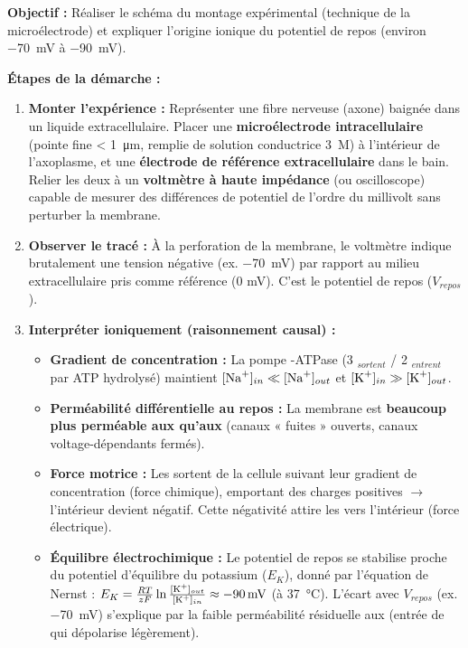 \documentclass[11pt]{article}
\newcommand{\cle}[1]{{\popxbold\color{popdark}#1}}
\begin{document}
\begin{methode}
\textbf{Objectif :} Réaliser le schéma du montage expérimental (technique de la microélectrode) et expliquer l'origine ionique du potentiel de repos (environ \SI{-70}{mV} à \SI{-90}{mV}).

\textbf{Étapes de la démarche :}
\begin{enumerate}
    \item \textbf{Monter l'expérience :} Représenter une fibre nerveuse (axone) baignée dans un liquide extracellulaire. Placer une \textbf{microélectrode intracellulaire} (pointe fine < \SI{1}{\micro\meter}, remplie de solution conductrice  \SI{3}{M}) à l'intérieur de l'axoplasme, et une \textbf{électrode de référence extracellulaire} dans le bain. Relier les deux à un \textbf{voltmètre à haute impédance} (ou oscilloscope) capable de mesurer des différences de potentiel de l'ordre du millivolt sans perturber la membrane.
    \item \textbf{Observer le tracé :} À la perforation de la membrane, le voltmètre indique brutalement une tension négative (ex. \SI{-70}{mV}) par rapport au milieu extracellulaire pris comme référence (0 mV). C'est le \cle{potentiel de repos} ($V_{repos}$).
    \item \textbf{Interpréter ioniquement (raisonnement causal) :}
    \begin{itemize}
        \item \textbf{Gradient de concentration :} La pompe -ATPase (3 $_{sortent}$ / 2 $_{entrent}$ par ATP hydrolysé) maintient $[\ce{Na+}]_{in} \ll [\ce{Na+}]_{out}$ et $[\ce{K+}]_{in} \gg [\ce{K+}]_{out}$.
        \item \textbf{Perméabilité différentielle au repos :} La membrane est \textbf{beaucoup plus perméable aux  qu'aux } (canaux  « fuites » ouverts, canaux  voltage-dépendants fermés).
        \item \textbf{Force motrice :} Les  sortent de la cellule suivant leur gradient de concentration (force chimique), emportant des charges positives $\rightarrow$ l'intérieur devient négatif. Cette négativité attire les  vers l'intérieur (force électrique).
        \item \textbf{Équilibre électrochimique :} Le potentiel de repos se stabilise proche du \cle{potentiel d'équilibre du potassium} ($E_K$), donné par l'équation de Nernst : $E_K = \frac{RT}{zF} \ln \frac{[\ce{K+}]_{out}}{[\ce{K+}]_{in}} \approx \SI{-90}{mV}$ (à \SI{37}{\celsius}). L'écart avec $V_{repos}$ (ex. \SI{-70}{mV}) s'explique par la faible perméabilité résiduelle aux  (entrée de  qui dépolarise légèrement).
    \end{itemize}
\end{enumerate}


\end{methode}
\end{document}
